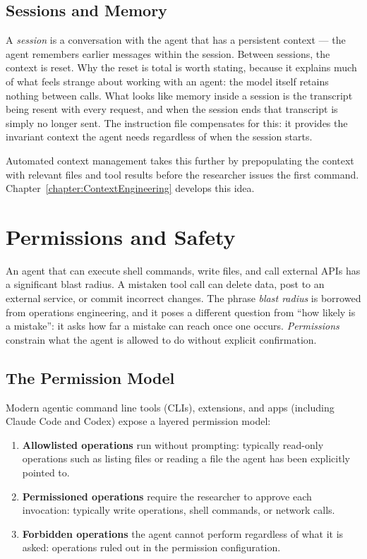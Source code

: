 \subsection{Sessions and Memory}

A \emph{session} is a conversation with the agent that has a persistent context — the agent remembers earlier messages within the session.
Between sessions, the context is reset.
Why the reset is total is worth stating, because it explains much of what feels strange about working with an agent: the model itself retains nothing between calls.
What looks like memory inside a session is the transcript being resent with every request, and when the session ends that transcript is simply no longer sent.
The instruction file compensates for this: it provides the invariant context the agent needs regardless of when the session starts.

Automated context management takes this further by prepopulating the context with relevant files and tool results before the researcher issues the first command.
Chapter~\ref{chapter:ContextEngineering} develops this idea.

\section{Permissions and Safety}
\label{section:Permissions}

An agent that can execute shell commands, write files, and call external APIs has a significant blast radius.
A mistaken tool call can delete data, post to an external service, or commit incorrect changes.
The phrase \emph{blast radius} is borrowed from operations engineering, and it poses a different question from ``how likely is a mistake'': it asks how far a mistake can reach once one occurs.
\emph{Permissions} constrain what the agent is allowed to do without explicit confirmation.

\subsection{The Permission Model}

Modern agentic command line tools (CLIs), extensions, and apps (including Claude Code and Codex) expose a layered permission model:
\begin{enumerate}
\item \textbf{Allowlisted operations} run without prompting: typically read-only operations such as listing files or reading a file the agent has been explicitly pointed to.
\item \textbf{Permissioned operations} require the researcher to approve each invocation: typically write operations, shell commands, or network calls.
\item \textbf{Forbidden operations} the agent cannot perform regardless of what it is asked: operations ruled out in the permission configuration.
\end{enumerate}

